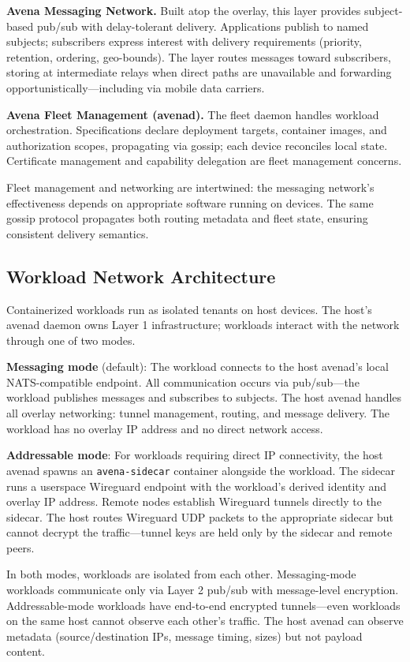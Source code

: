 \documentclass[journal]{IEEEtran}
\begin{document}
\textbf{Avena Messaging Network.} Built atop the overlay, this layer provides subject-based pub/sub with delay-tolerant delivery. Applications publish to named subjects; subscribers express interest with delivery requirements (priority, retention, ordering, geo-bounds). The layer routes messages toward subscribers, storing at intermediate relays when direct paths are unavailable and forwarding opportunistically---including via mobile data carriers.

\textbf{Avena Fleet Management (avenad).} The fleet daemon handles workload orchestration. Specifications declare deployment targets, container images, and authorization scopes, propagating via gossip; each device reconciles local state. Certificate management and capability delegation are fleet management concerns.

Fleet management and networking are intertwined: the messaging network's effectiveness depends on appropriate software running on devices. The same gossip protocol propagates both routing metadata and fleet state, ensuring consistent delivery semantics.

\subsection{Workload Network Architecture}

Containerized workloads run as isolated tenants on host devices. The host's avenad daemon owns Layer 1 infrastructure; workloads interact with the network through one of two modes.

\textbf{Messaging mode} (default): The workload connects to the host avenad's local NATS-compatible endpoint. All communication occurs via pub/sub---the workload publishes messages and subscribes to subjects. The host avenad handles all overlay networking: tunnel management, routing, and message delivery. The workload has no overlay IP address and no direct network access.

\textbf{Addressable mode}: For workloads requiring direct IP connectivity, the host avenad spawns an \texttt{avena-sidecar} container alongside the workload. The sidecar runs a userspace Wireguard endpoint with the workload's derived identity and overlay IP address. Remote nodes establish Wireguard tunnels directly to the sidecar. The host routes Wireguard UDP packets to the appropriate sidecar but cannot decrypt the traffic---tunnel keys are held only by the sidecar and remote peers.

In both modes, workloads are isolated from each other. Messaging-mode workloads communicate only via Layer 2 pub/sub with message-level encryption. Addressable-mode workloads have end-to-end encrypted tunnels---even workloads on the same host cannot observe each other's traffic. The host avenad can observe metadata (source/destination IPs, message timing, sizes) but not payload content.
\end{document}
